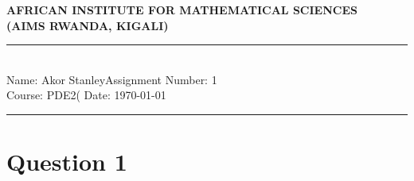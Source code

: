 \documentclass[12pt,a4paper]{article}
\newcommand{\student}{Akor Stanley}
\newcommand{\course}{PDE2\left(  }
\newcommand{\assignment}{1}
\begin{document}
\thispagestyle{empty}
\begin{center}
\textbf{AFRICAN INSTITUTE FOR MATHEMATICAL SCIENCES \\[0.5cm]
(AIMS RWANDA, KIGALI)}
\vspace{1.0cm}
\end{center}
\noindent
\rule{17cm}{0.2cm}\\[0.3cm]
Name: \student \hfill Assignment Number: \assignment\\[0.1cm]
Course: \course \hfill Date: \today\\
\rule{17cm}{0.05cm}
\vspace{1.0cm}
\section*{Question 1}
\end{document}
